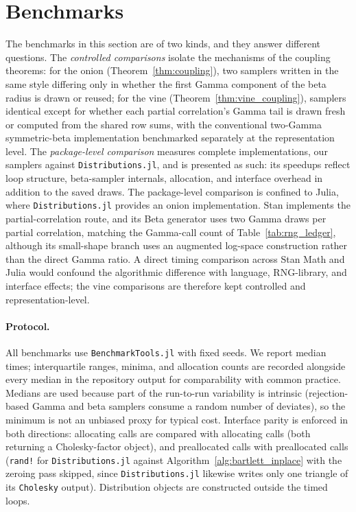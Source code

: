 \documentclass[12pt,english]{article}
\theoremstyle{plain} %
\theoremstyle{definition} %
\theoremstyle{remark} %
\begin{document}
\section{Benchmarks}
\label{sec:numerical}

The benchmarks in this section are of two kinds, and they answer different questions. The \emph{controlled comparisons} isolate the mechanisms of the coupling theorems: for the onion (Theorem~\ref{thm:coupling}), two samplers written in the same style differing only in whether the first Gamma component of the beta radius is drawn or reused; for the vine (Theorem~\ref{thm:vine_coupling}), samplers identical except for whether each partial correlation's Gamma tail is drawn fresh or computed from the shared row sums, with the conventional two-Gamma symmetric-beta implementation benchmarked separately at the representation level. The \emph{package-level comparison} measures complete implementations, our samplers against \texttt{Distributions.jl}, and is presented as such: its speedups reflect loop structure, beta-sampler internals, allocation, and interface overhead in addition to the saved draws. The package-level comparison is confined to Julia, where \texttt{Distributions.jl} provides an onion implementation. Stan implements the partial-correlation route, and its Beta generator uses two Gamma draws per partial correlation, matching the Gamma-call count of Table~\ref{tab:rng_ledger}, although its small-shape branch uses an augmented log-space construction rather than the direct Gamma ratio. A direct timing comparison across Stan Math and Julia would confound the algorithmic difference with language, RNG-library, and interface effects; the vine comparisons are therefore kept controlled and representation-level.

\paragraph{Protocol.}
All benchmarks use \texttt{BenchmarkTools.jl} \citep{ChenRevels:2016} with fixed seeds. We report median times; interquartile ranges, minima, and allocation counts are recorded alongside every median in the repository output for comparability with common practice. Medians are used because part of the run-to-run variability is intrinsic (rejection-based Gamma and beta samplers consume a random number of deviates), so the minimum is not an unbiased proxy for typical cost. Interface parity is enforced in both directions: allocating calls are compared with allocating calls (both returning a Cholesky-factor object), and preallocated calls with preallocated calls (\texttt{rand!} for \texttt{Distributions.jl} against Algorithm~\ref{alg:bartlett_inplace} with the zeroing pass skipped, since \texttt{Distributions.jl} likewise writes only one triangle of its \texttt{Cholesky} output). Distribution objects are constructed outside the timed loops.
\end{document}
